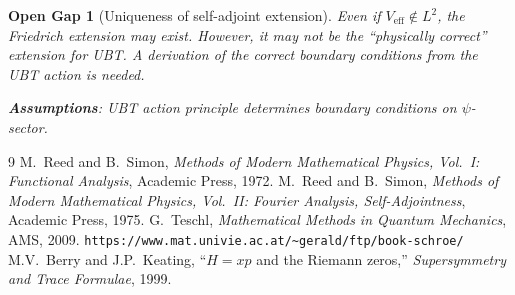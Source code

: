 \documentclass[11pt,a4paper]{article}
\newtheorem{gap}{Open Gap}
\begin{document}
\begin{gap}[Uniqueness of self-adjoint extension]
  Even if $V_\mathrm{eff} \notin L^2$, the Friedrich extension may exist.
  However, it may not be the ``physically correct'' extension for UBT.
  A derivation of the correct boundary conditions from the UBT action is needed.

  \textbf{Assumptions}: UBT action principle determines boundary conditions
  on $\psi$-sector.
\end{gap}

\begin{thebibliography}{9}
 M.\ Reed and B.\ Simon, \emph{Methods of Modern
  Mathematical Physics, Vol.\ I: Functional Analysis}, Academic Press, 1972.
 M.\ Reed and B.\ Simon, \emph{Methods of Modern
  Mathematical Physics, Vol.\ II: Fourier Analysis, Self-Adjointness},
  Academic Press, 1975.
 G.\ Teschl, \emph{Mathematical Methods in Quantum Mechanics},
  AMS, 2009.  \texttt{https://www.mat.univie.ac.at/\textasciitilde gerald/ftp/book-schroe/}
 M.V.\ Berry and J.P.\ Keating,
  ``$H = xp$ and the Riemann zeros,'' \emph{Supersymmetry and Trace Formulae}, 1999.
\end{thebibliography}
\end{document}
